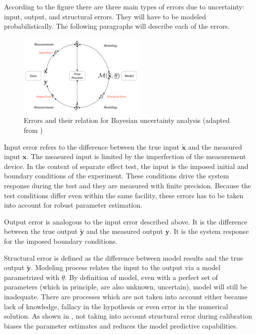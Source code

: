 \documentclass[11pt,titlepage]{article}
\begin{document}
According to the figure there are three main types of errors due to uncertainty: input, output, and structural errors. 
They will have to be modeled probabilistically.
The following paragraphs will describe each of the errors.
\begin{figure}[htbp]
	\centering
	\includegraphics[width=0.55\textwidth]{HuardMailhot.pdf}
	\caption{Errors and their relation for Bayesian uncertainty analysis (adapted from \cite{HuardMailhot2006})}
	\label{fig:HuardMailhot}
\end{figure}

Input error refers to the difference between the true input $\mathbf{\tilde{x}}$ and the measured input $\mathbf{x}$. 
The measured input is limited by the imperfection of the measurement device. 
In the context of separate effect test, the input is the imposed initial and boundary conditions of the experiment. 
These conditions drive the system response during the test and they are measured with finite precision. 
Because the test conditions differ even within the same facility, these errors has to be taken into account for robust parameter estimation.

Output error is analogous to the input error described above. 
It is the difference between the true output $\mathbf{\tilde{y}}$ and the measured output $\mathbf{y}$. 
It is the system response for the imposed boundary conditions. 

Structural error is defined as the difference between model results and the true output $\mathbf{\tilde{y}}$. 
Modeling process relates the input to the output via a model parametrized with $\underline{\theta}$. 
By definition of model, even with a perfect set of parameters (which in principle, are also unknown, uncertain), model will still be inadequate. 
There are processes which are not taken into account either because lack of knowledge, fallacy in the hypothesis or even error in the numerical solution. 
As shown in \cite{KennedyOHagan2001}, not taking into account structural error during calibration biases the parameter estimates and reduces the model predictive capabilities.
\end{document}
